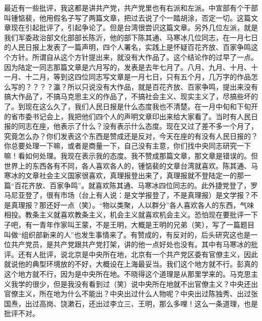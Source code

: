 最近有一些批评，我这都是讲共产党，共产党里也有右派和左派。中宣部有个干部叫锺惦裴，他用假名子写了两篇文章，把过去说了个一踏胡涂，否定一切。这篇文章现在引起批评了，引起争论了。但是台湾很尝识这篇文章。另外几位左派，就是我们军委政治部文化部部长陈沂，他的部下陈其通、马寒冰几位同志，在一月七日的人民日报上发表了一篇声明，四个人署名，实践上是怀疑百花齐放、百家争鸣这个方针。所谓自从这个方针提出来，就没有大作品了。这个结论作的过早了一点。因为陆定一同志那篇文章是六月写的，发表是去年七月了。八月、九月、十月、十一月、十二月，等到这四位同志写文章是一月七日，只有五个月，几万字的作品怎么写的？？？？瀛？所以只说没有大作品，就是百花齐放、百家争鸣，提出来没有搞大作品了，不搞马克思主义的作品了，不搞社会主义、现实主义了，尽搞些坏的了。到现在这么久了，我们人民日报是什么态度我也不清楚。在一月中旬和下旬开的省市委书记会上，我把他们四个人的声明文章印出来给大家看了。当时有人民日报的同志在座，他表示了什么？没有表示什么态度。现在又过了差不多一个月了，究竟怎么办？你们发表这个东西是赞成还是反对，今天在座的有没有人民日报的？你总要处理一下嘛，或者是商量一下，自己没有主意，你们找中央同志研究一下嘛！看如何处理。我现在表示我的态度。我不赞成那篇文章，那文章是错误的。但世界上的东西各有不同，各人喜欢各人的，锺惦裴的文章台湾就喜欢。陈其通、马寒冰的文章社会主义国家很喜欢，真理报登出来了，真理报就不登陆定一的那一篇“百花齐放、百家争鸣”。就喜欢陈其通、马寒冰四位同志的。此外捷党登了，罗马尼亚登了，很有市场（台上有人说：是文学报登了，不是真理报）是文学报？不是真理报？那还好一点（笑）。“物以类聚，人以群分”各人喜欢各人的东西，气味相投。教条主义就喜欢教条主义，机会主义就喜欢机会主义。恐怕现在要批评一下子吧，有一青年作家叫王蒙，不是王明，大概是王明的兄弟（笑），写了一篇题目叫做“组织部新来的人”也发生事情来了。有赞成的，有反对的，后头研究这也是一位共产党员，是共产党跟共产党打架，讲的他一点好处也没有。其中有马寒冰的批评。还有人批评，说北京是中央所在地，北京有一个共产党区委有官僚主义，因此就说他的典型环境放的不好，大概设在上海最妥当。我们这个地方就不行。彭真的这个地方就不行，因为是中央所在地。不晓得这个道理是从那里学来的。马克思主义我学的很少，但是我没有看到过（笑）说中央所在地就不出官僚主义？中央还出官僚主义，所在地为什么不能出？中央出过什么人物呢？中央出过陈独秀、出过张国焘，出过高岗、饶漱石，还出过李立三、王明，那么多哩！这么一条道理，也是批评不对。

